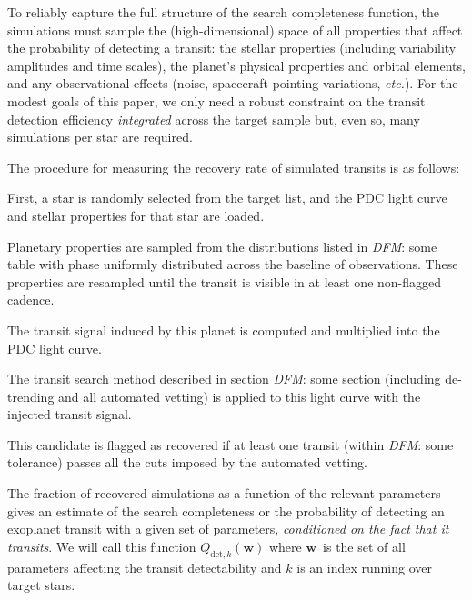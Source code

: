 \documentclass[manuscript, letterpaper]{aastex6}
\newcommand{\foreign}[1]{\emph{#1}}
\newcommand{\etc}{\foreign{etc.}}
\newcommand{\bvec}[1]{{\ensuremath{\boldsymbol{#1}}}}
\newcommand{\todo}[3]{{\color{#2}\emph{#1}: #3}}
\newcommand{\dfmtodo}[1]{\todo{DFM}{red}{#1}}
\newcommand{\params}{{\ensuremath{\bvec{w}}}}
\begin{document}
To reliably capture the full structure of the search completeness function,
the simulations must sample the (high-dimensional) space of all properties
that affect the probability of detecting a transit: the stellar properties
(including variability amplitudes and time scales), the planet's physical
properties and orbital elements, and any observational effects (noise,
spacecraft pointing variations, \etc).
For the modest goals of this paper, we only need a robust constraint on the
transit detection efficiency \emph{integrated} across the target sample but,
even so, many simulations per star are required.

The procedure for measuring the recovery rate of simulated transits is as
follows:
\begin{enumerate}
{\item First, a star is randomly selected from the target list, and the PDC
light curve and stellar properties for that star are loaded.}
{\item Planetary properties are sampled from the distributions listed in
\dfmtodo{some table} with phase uniformly distributed across the baseline of
observations. These properties are resampled until the transit is visible in
at least one non-flagged cadence.}
{\item The transit signal induced by this planet is computed and multiplied
into the PDC light curve.}
{\item The transit search method described in section \dfmtodo{some section}
(including de-trending and all automated vetting) is applied to this light
curve with the injected transit signal.}
{\item This candidate is flagged as recovered if at least one transit (within
\dfmtodo{some tolerance}) passes all the cuts imposed by the automated
vetting.}
\end{enumerate}

The fraction of recovered simulations as a function of the relevant parameters
gives an estimate of the search completeness or the probability of detecting
an exoplanet transit with a given set of parameters, \emph{conditioned on the
fact that it transits}.
We will call this function $Q_{\mathrm{det},k}(\params)$ where \params\ is the
set of all parameters affecting the transit detectability and $k$ is an index
running over target stars.
\end{document}
